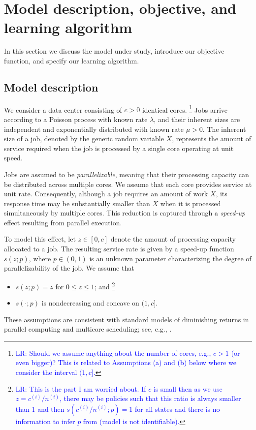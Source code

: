 \documentclass[11pt]{article}
\theoremstyle{remark}
\theoremstyle{definition}
\numberwithin{equation}{section}
\begin{document}
\section{Model description, objective, and learning algorithm}\label{section: model description}

In this section we discuss the model under study, introduce our objective function, and specify our learning algorithm.


\subsection{Model description}

We consider a data center consisting of $c>0$ identical cores. \footnote{\textcolor{blue}{LR: Should we assume anything about the number of cores, e.g., $c>1$ (or even bigger)? This is related to Assumptions (a) and (b) below where we consider the interval $(1,c]$.}} Jobs arrive according to a Poisson process with known rate $\lambda$, and their inherent sizes are independent and exponentially distributed with known rate $\mu>0$. The inherent size of a job, denoted by the generic random variable $X$, represents the amount of service required when the job is processed by a single core operating at unit speed.

Jobs are assumed to be \emph{parallelizable}, meaning that their processing capacity can be distributed across multiple cores. We assume that each core provides service at unit rate. Consequently, although a job requires an amount of work $X$, its response time may be substantially smaller than $X$ when it is processed simultaneously by multiple cores. This reduction is captured through a \emph{speed-up} effect resulting from parallel execution.

To model this effect, let $z \in [0,c]$ denote the amount of processing capacity allocated to a job. The resulting service rate is given by a speed-up function $s(z;p)$, where $p \in (0,1)$ is an unknown parameter characterizing the degree of parallelizability of the job. We assume that
\begin{itemize}
\item[(a)] $s(z;p)=z$ for $0 \leq z \leq 1$; and \footnote{\textcolor{blue}{LR: This is the part I am worried about. If $c$ is small then as we use $z=c^{(i)}/n^{(i)}$, there may be policies such that this ratio is always smaller than 1 and then $s(c^{(i)}/n^{(i)};p)=1$ for all states and there is no information to infer $p$ from (model is not identifiable).}}
\item[(b)] $s(\cdot;p)$ is nondecreasing and concave on $(1,c]$.
\end{itemize}
These assumptions are consistent with standard models of diminishing returns in parallel computing and multicore scheduling; see, e.g., \cite{berg2017,hill2008}.
\end{document}
